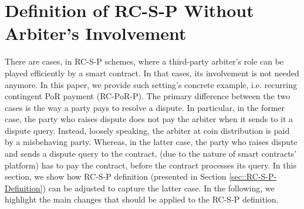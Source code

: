 
\section{Definition of RC-S-P Without Arbiter's Involvement}\label{sec::RC-S-P-Definition2}
There are cases, in RC-S-P schemes, where a third-party arbiter's role  can be played efficiently by a smart contract.  In that cases,  its involvement is not needed anymore. In this paper, we provide such setting's concrete example, i.e. recurring contingent PoR payment (RC-PoR-P). The primary difference between the two cases is the way a party pays to resolve a dispute. In particular, in the former case, the party who raises dispute does not pay the arbiter when it sends to it a dispute query. Instead, loosely speaking, the arbiter at coin distribution is paid by a misbehaving party. Whereas, in the latter case, the party who raises dispute and sends a dispute query to the contract, (due to the nature of smart contracts' platform) has to pay the contract, before the contract processes its query.  In this section, we show how RC-S-P definition (presented in Section \ref{sec::RC-S-P-Definition}) can be  adjusted to  capture the latter case. In the following, we highlight the main changes that should be applied to the RC-S-P definition. 

